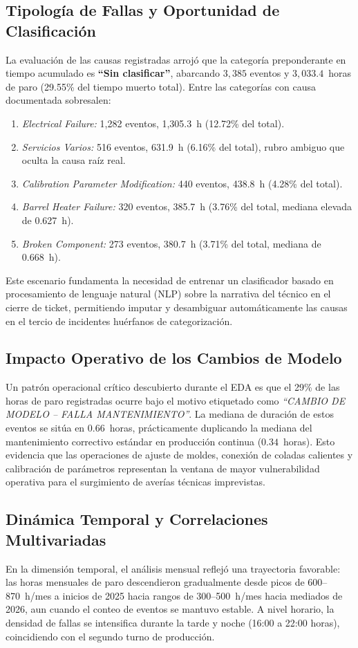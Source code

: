 \documentclass[conference]{IEEEtran}
\begin{document}
\subsection{Tipología de Fallas y Oportunidad de Clasificación}
La evaluación de las causas registradas arrojó que la categoría preponderante en tiempo acumulado es \textbf{``Sin clasificar''}, abarcando $3,385$ eventos y $3,033.4$~horas de paro (29.55\% del tiempo muerto total). Entre las categorías con causa documentada sobresalen:
\begin{enumerate}
    \item \textit{Electrical Failure:} 1,282 eventos, 1,305.3~h (12.72\% del total).
    \item \textit{Servicios Varios:} 516 eventos, 631.9~h (6.16\% del total), rubro ambiguo que oculta la causa raíz real.
    \item \textit{Calibration Parameter Modification:} 440 eventos, 438.8~h (4.28\% del total).
    \item \textit{Barrel Heater Failure:} 320 eventos, 385.7~h (3.76\% del total, mediana elevada de 0.627~h).
    \item \textit{Broken Component:} 273 eventos, 380.7~h (3.71\% del total, mediana de 0.668~h).
\end{enumerate}
Este escenario fundamenta la necesidad de entrenar un clasificador basado en procesamiento de lenguaje natural (NLP) sobre la narrativa del técnico en el cierre de ticket, permitiendo imputar y desambiguar automáticamente las causas en el tercio de incidentes huérfanos de categorización.

\subsection{Impacto Operativo de los Cambios de Modelo}
Un patrón operacional crítico descubierto durante el EDA es que el 29\% de las horas de paro registradas ocurre bajo el motivo etiquetado como \textit{``CAMBIO DE MODELO -- FALLA MANTENIMIENTO''}. La mediana de duración de estos eventos se sitúa en $0.66$~horas, prácticamente duplicando la mediana del mantenimiento correctivo estándar en producción continua ($0.34$~horas). Esto evidencia que las operaciones de ajuste de moldes, conexión de coladas calientes y calibración de parámetros representan la ventana de mayor vulnerabilidad operativa para el surgimiento de averías técnicas imprevistas.

\subsection{Dinámica Temporal y Correlaciones Multivariadas}
En la dimensión temporal, el análisis mensual reflejó una trayectoria favorable: las horas mensuales de paro descendieron gradualmente desde picos de 600--870~h/mes a inicios de 2025 hacia rangos de 300--500~h/mes hacia mediados de 2026, aun cuando el conteo de eventos se mantuvo estable. A nivel horario, la densidad de fallas se intensifica durante la tarde y noche (16:00 a 22:00 horas), coincidiendo con el segundo turno de producción.
\end{document}
